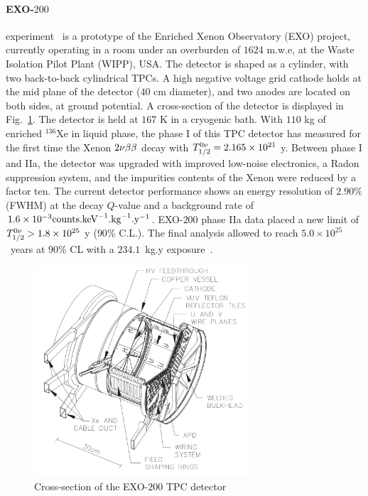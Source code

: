 
\paragraph{EXO-$200$} experiment~\cite{art:EXO200_2012} is a prototype of the Enriched Xenon Observatory (EXO) project, currently operating in a room under an overburden of $1624$ m.w.e, at the Waste Isolation Pilot Plant (WIPP), USA.
The detector is shaped as a cylinder, with two back-to-back cylindrical TPCs.
A high negative voltage grid cathode holds at the mid plane of the detector ($40$ cm diameter), and two anodes are located on both sides, at ground potential.
A cross-section of the detector is displayed in Fig.~\ref{fig:EXO-200}.
The detector is held at $167$ K in a cryogenic bath.
With $110$ kg of enriched $^{136}$Xe in liquid phase, the phase I of this TPC detector has measured for the first time the Xenon $2\nu\beta\beta$ decay with $T_{1/2}^{0\nu}=2.165\times 10^{21}$ y.
Between phase I and IIa, the detector was upgraded with improved low-noise electronics, a Radon suppression system, and the impurities contents of the Xenon were reduced by a factor ten.
The current detector performance shows an energy resolution of $2.90$\% (FWHM) at the decay $Q$-value and a background rate of $1.6\times 10^{-3}\text{counts.keV}^{-1}\text{.kg}^{-1}\text{.y}^{-1}$.
EXO-$200$ phase IIa data placed a new limit of $T_{1/2}^{0\nu}>1.8\times 10^{25}$ y ($90$\% C.L.).
The final analysis allowed to reach $5.0\times 10^{25}$~years at $90$\% CL with a $234.1$~kg.y exposure~\cite{art:EXO200_2019}.

\begin{figure}
  \centering
  \includegraphics[width=8cm]{neutrinophysics/fig_neutrinophysics/EXO-200.png}
  \caption{Cross-section of the EXO-$200$ TPC detector
    \label{fig:EXO-200}}
\end{figure}

